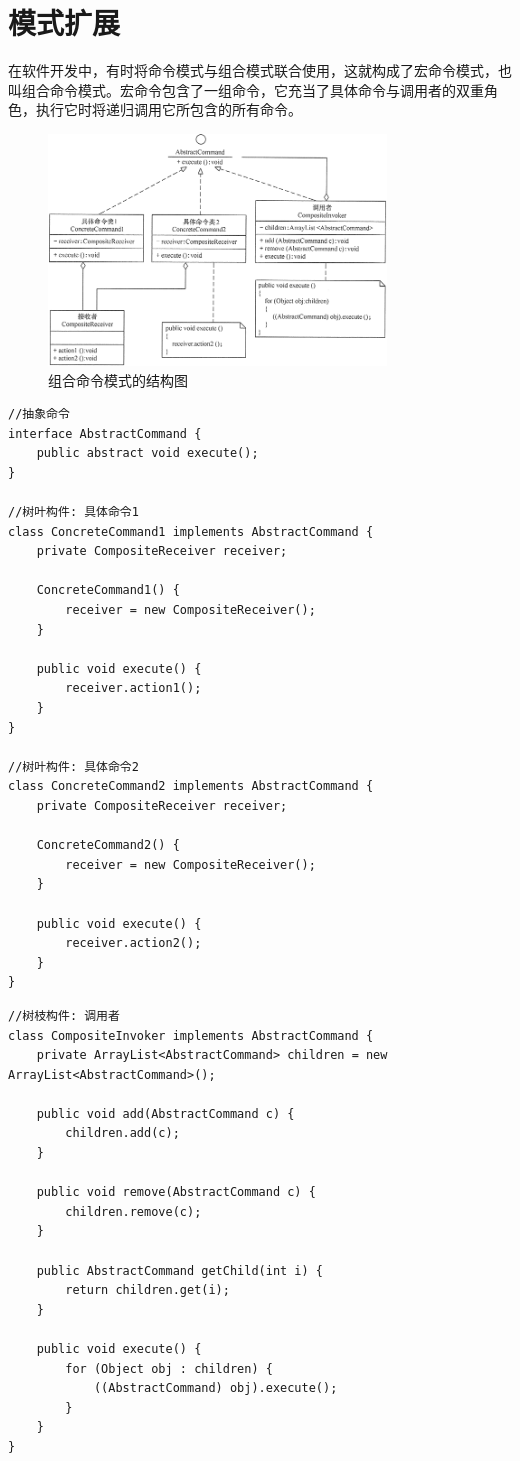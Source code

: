 \section{模式扩展}
在软件开发中，有时将命令模式与组合模式联合使用，这就构成了宏命令模式，也叫组合命令模式。宏命令包含了一组命令，它充当了具体命令与调用者的双重角色，执行它时将递归调用它所包含的所有命令。
\begin{figure}[!h]
	\centering
	\includegraphics[width=0.8\textwidth]{image/22-3}
	\caption{组合命令模式的结构图}
\end{figure}
\begin{lstlisting}
//抽象命令
interface AbstractCommand {
	public abstract void execute();
}

//树叶构件: 具体命令1
class ConcreteCommand1 implements AbstractCommand {
	private CompositeReceiver receiver;
	
	ConcreteCommand1() {
		receiver = new CompositeReceiver();
	}
	
	public void execute() {
		receiver.action1();
	}
}

//树叶构件: 具体命令2
class ConcreteCommand2 implements AbstractCommand {
	private CompositeReceiver receiver;
	
	ConcreteCommand2() {
		receiver = new CompositeReceiver();
	}
	
	public void execute() {
		receiver.action2();
	}
}
\end{lstlisting}
\begin{lstlisting}
//树枝构件: 调用者
class CompositeInvoker implements AbstractCommand {
	private ArrayList<AbstractCommand> children = new ArrayList<AbstractCommand>();
	
	public void add(AbstractCommand c) {
		children.add(c);
	}
	
	public void remove(AbstractCommand c) {
		children.remove(c);
	}
	
	public AbstractCommand getChild(int i) {
		return children.get(i);
	}
	
	public void execute() {
		for (Object obj : children) {
			((AbstractCommand) obj).execute();
		}
	}
}
\end{lstlisting}

